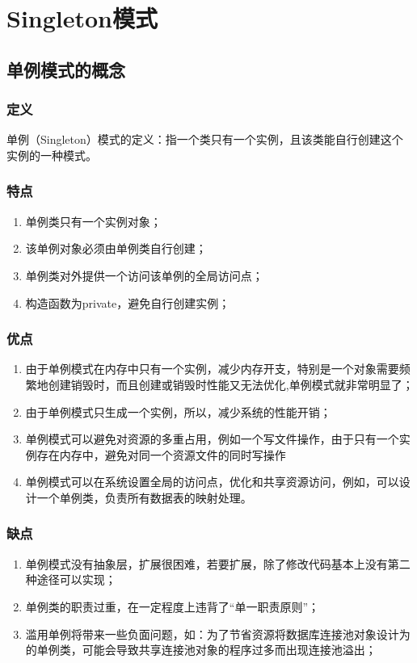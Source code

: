 \chapter{Singleton模式}
\section{单例模式的概念}
\subsection{定义}
单例（Singleton）模式的定义：指一个类只有一个实例，且该类能自行创建这个实例的一种模式。
\subsection{特点}
\begin{enumerate}
	\item 单例类只有一个实例对象；
	\item 该单例对象必须由单例类自行创建；
	\item 单例类对外提供一个访问该单例的全局访问点；
	\item 构造函数为private，避免自行创建实例；
\end{enumerate}
\subsection{优点}
\begin{enumerate}
	\item 由于单例模式在内存中只有一个实例，减少内存开支，特别是一个对象需要频繁地创建销毁时，而且创建或销毁时性能又无法优化,单例模式就非常明显了；
	\item 由于单例模式只生成一个实例，所以，减少系统的性能开销；
	\item 单例模式可以避免对资源的多重占用，例如一个写文件操作，由于只有一个实例存在内存中，避免对同一个资源文件的同时写操作
	\item 单例模式可以在系统设置全局的访问点，优化和共享资源访问，例如，可以设计一个单例类，负责所有数据表的映射处理。
\end{enumerate}
\subsection{缺点}
\begin{enumerate}
	\item 单例模式没有抽象层，扩展很困难，若要扩展，除了修改代码基本上没有第二种途径可以实现；
	\item 单例类的职责过重，在一定程度上违背了“单一职责原则”；
	\item 滥用单例将带来一些负面问题，如：为了节省资源将数据库连接池对象设计为的单例类，可能会导致共享连接池对象的程序过多而出现连接池溢出；
\end{enumerate}
